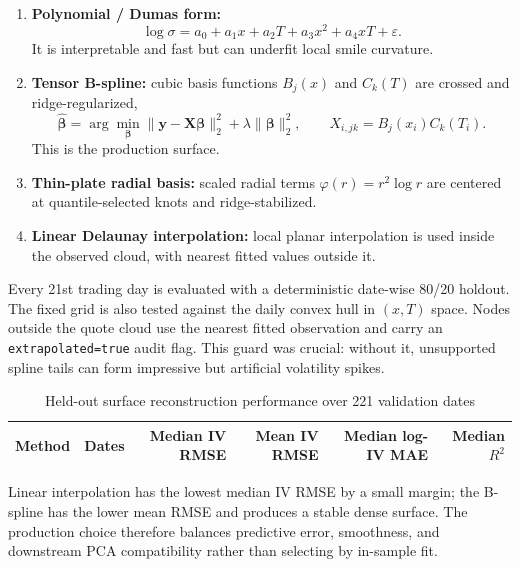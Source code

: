 \documentclass[11pt,a4paper]{article}
\newcommand{\code}[1]{\texttt{#1}}
\begin{document}
\begin{enumerate}
  \item \textbf{Polynomial / Dumas form:}
  \begin{equation}
  \log\sigma=a_0+a_1x+a_2T+a_3x^2+a_4xT+\varepsilon.
  \end{equation}
  It is interpretable and fast but can underfit local smile curvature.

  \item \textbf{Tensor B-spline:} cubic basis functions $B_j(x)$ and $C_k(T)$ are crossed and
  ridge-regularized,
  \begin{equation}
  \widehat{\bm\beta}=\arg\min_{\bm\beta}
  \|\bm y-\bm X\bm\beta\|_2^2+\lambda\|\bm\beta\|_2^2,
  \qquad X_{i,jk}=B_j(x_i)C_k(T_i).
  \end{equation}
  This is the production surface.

  \item \textbf{Thin-plate radial basis:} scaled radial terms
  $\varphi(r)=r^2\log r$ are centered at quantile-selected knots and ridge-stabilized.

  \item \textbf{Linear Delaunay interpolation:} local planar interpolation is used inside the
  observed cloud, with nearest fitted values outside it.
\end{enumerate}

Every 21st trading day is evaluated with a deterministic date-wise 80/20 holdout. The fixed grid is
also tested against the daily convex hull in $(x,T)$ space. Nodes outside the quote cloud use the
nearest fitted observation and carry an \code{extrapolated=true} audit flag. This guard was crucial:
without it, unsupported spline tails can form impressive but artificial volatility spikes.

\begin{table}[H]
\centering
\caption{Held-out surface reconstruction performance over 221 validation dates}
\label{tab:surface-methods}
\begin{tabular}{lrrrrr}
\toprule
Method & Dates & Median IV RMSE & Mean IV RMSE & Median log-IV MAE & Median $R^2$ \\
\midrule

\end{tabular}
\end{table}

Linear interpolation has the lowest median IV RMSE by a small margin; the B-spline has the lower mean
RMSE and produces a stable dense surface. The production choice therefore balances predictive error,
smoothness, and downstream PCA compatibility rather than selecting by in-sample fit.
\end{document}
